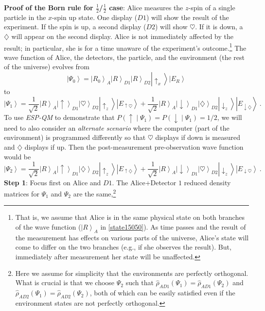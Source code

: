 \documentclass[onecolumn,secnumarabic,amsmath,amssymb,balancelastpage,nofootinbib]{article}
\newcommand{\ket}[1]{\ensuremath{\left|#1\right\rangle}}
\begin{document}
\textbf{Proof of the Born rule for $\frac{1}{2}$/$\frac{1}{2}$ case}: Alice measures the $z$-spin of a single particle in the $x$-spin up state.  One display ($D1$) will show the result of the experiment.  If the spin is up, a second display ($D2$) will show $\heartsuit$.  If it is down, a $\diamondsuit$ will appear on the second display.  Alice is not immediately affected by the result; in particular, she is for a time unaware of the experiment's outcome.\footnote{That is, we assume that Alice is in the same physical state on both branches of the wave function ($\ket{R}_A$ in \eqref{state15050}).  As time passes and the result of the measurement has effects on various parts of the universe, Alice's state will come to differ on the two branches (e.g., if she observes the result).  But, immediately after measurement her state will be unaffected.} The wave function of Alice, the detectors, the particle, and the environment (the rest of the universe) evolves from
\begin{equation}
\ket{\Psi_0}=\ket{R_0}_A\ket{R}_{D1}\ket{R}_{D2}\ket{\uparrow_x}\ket{E_R}
\end{equation}
to
\begin{equation}
\ket{\Psi_1}=\frac{1}{\sqrt{2}}\ket{R}_A\ket{\uparrow}_{D1}\ket{\heartsuit}_{D2}\ket{\uparrow_z}\ket{E_{\uparrow \heartsuit}}+\frac{1}{\sqrt{2}}\ket{R}_A\ket{\downarrow}_{D1}\ket{\diamondsuit}_{D2}\ket{\downarrow_z}\ket{E_{\downarrow\diamondsuit}}\ .
\label{state15050}
\end{equation}
To use \emph{ESP-QM} to demonstrate that $P\left(\uparrow\middle|\Psi_1\right)=P\left(\downarrow\middle|\Psi_1\right)=1/2$, we will need to also consider an \textit{alternate scenario} where the computer (part of the environment) is programmed differently so that $\heartsuit$ displays if down is measured and $\diamondsuit$ displays if up.  Then the post-measurement pre-observation wave function would be
\begin{equation}
\ket{\Psi_2}=\frac{1}{\sqrt{2}}\ket{R}_A\ket{\uparrow}_{D1}\ket{\diamondsuit}_{D2}\ket{\uparrow_z}\ket{E_{\uparrow \diamondsuit}}+\frac{1}{\sqrt{2}}\ket{R}_A\ket{\downarrow}_{D1}\ket{\heartsuit}_{D2}\ket{\downarrow_z}\ket{E_{\downarrow \heartsuit}}\ .
\label{state25050}
\end{equation}
\textbf{Step 1}:  Focus first on Alice and $D1$.  The Alice+Detector $1$ reduced density matrices for $\Psi_1$ and $\Psi_2$ are the same,\footnote{Here we assume for simplicity that the environments are perfectly orthogonal.  What is crucial is that we choose $\Psi_2$ such that $\widehat{\rho}_{AD1}\left(\Psi_1\right)=\widehat{\rho}_{AD1}\left(\Psi_2\right)$ and $\widehat{\rho}_{AD2}\left(\Psi_1\right)=\widehat{\rho}_{AD2}\left(\Psi_2\right)$, both of which can be easily satisfied even if the environment states are not perfectly orthogonal.}
\end{document}
